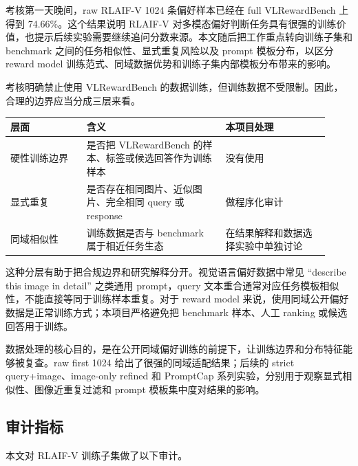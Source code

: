 \documentclass[11pt,a4paper]{ctexart}
\begin{document}
考核第一天晚间，raw RLAIF-V 1024 条偏好样本已经在 full VLRewardBench 上得到 74.66\%。这个结果说明 RLAIF-V 对多模态偏好判断任务具有很强的训练价值，也提示后续实验需要继续追问分数来源。本文随后把工作重点转向训练子集和 benchmark 之间的任务相似性、显式重复风险以及 prompt 模板分布，以区分 reward model 训练范式、同域数据优势和训练子集内部模板分布带来的影响。

考核明确禁止使用 VLRewardBench 的数据训练，但训练数据不受限制。因此，合理的边界应当分成三层来看。

\begin{center}\small
\begin{longtable}{p{0.22\linewidth} p{0.40\linewidth} p{0.30\linewidth}}
\toprule
层面 & 含义 & 本项目处理 \\
\midrule
硬性训练边界 & 是否把 VLRewardBench 的样本、标签或候选回答作为训练样本 & 没有使用 \\
显式重复 & 是否存在相同图片、近似图片、完全相同 query 或 response & 做程序化审计 \\
同域相似性 & 训练数据是否与 benchmark 属于相近任务生态 & 在结果解释和数据选择实验中单独讨论 \\
\bottomrule
\end{longtable}\end{center}

这种分层有助于把合规边界和研究解释分开。视觉语言偏好数据中常见 “describe this image in detail” 之类通用 prompt，query 文本重合通常对应任务模板相似性，不能直接等同于训练样本重复。对于 reward model 来说，使用同域公开偏好数据是正常训练方式；本项目严格避免把 benchmark 样本、人工 ranking 或候选回答用于训练。

数据处理的核心目的，是在公开同域偏好训练的前提下，让训练边界和分布特征能够被复查。raw first 1024 给出了很强的同域适配结果；后续的 strict query+image、image-only refined 和 PromptCap 系列实验，分别用于观察显式相似性、图像近重复过滤和 prompt 模板集中度对结果的影响。

\subsection{审计指标}

本文对 RLAIF-V 训练子集做了以下审计。
\end{document}
